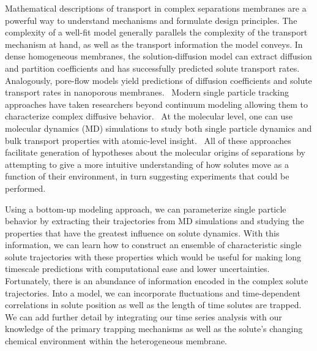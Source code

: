 \documentclass[12pt]{article}
\begin{document}
  Mathematical descriptions of transport in complex separations membranes are 
  a powerful way to understand mechanisms and formulate design principles. 
  \cite{vinh-thang_predictive_2013,geens_transport_2006,darvishmanesh_mass_2016}
  The complexity of a well-fit model generally parallels the complexity of the transport 
  mechanism at hand, as well as the transport information the model conveys.
  In dense homogeneous membranes, the solution-diffusion model can extract 
  diffusion and partition coefficients and has successfully predicted solute 
  transport rates.~\cite{wijmans_solution-diffusion_1995} Analogously, pore-flow
  models yield predictions of diffusion coefficients and solute transport rates 
  in nanoporous membranes.~\cite{paul_diffusive_1974} Modern single particle 
  tracking approaches have taken researchers beyond continuum modeling allowing them to 
  characterize complex diffusive behavior.~\cite{manzo_review_2015} At the molecular
  level, one can use molecular dynamics (MD) simulations to study both single 
  particle dynamics and bulk transport properties with atomic-level insight.~\cite{coscia_chemically_2019,maginn_best_2018}
  All of these approaches facilitate generation of hypotheses about the
  molecular origins of separations by attempting to give a more intuitive 
  understanding of how solutes move as a function of their environment, in turn
  suggesting experiments that could be performed.

  Using a bottom-up modeling approach, we can parameterize single particle behavior
  by extracting their trajectories from MD simulations and studying the properties that
  have the greatest influence on solute dynamics. With this information, we can learn
  how to construct an ensemble of characteristic single solute trajectories with these
  properties which would be useful for making long timescale predictions with computational
  ease and lower uncertainties. Fortunately, there is an abundance of information encoded
  in the complex solute trajectories. Into a
  model, we can incorporate fluctuations and time-dependent correlations in solute
  position as well as the length of time solutes are trapped. We can add further
  detail by integrating our time series analysis with our knowledge of the primary
  trapping mechanisms as well as the solute's changing chemical environment within
  the heterogeneous membrane. 

  
\end{document}
